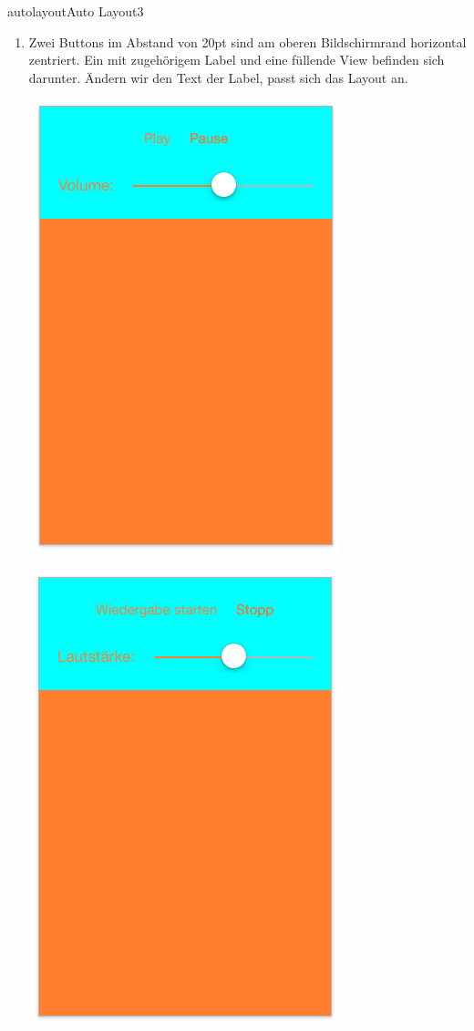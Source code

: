 \documentclass[parskip=half, final]{scrreprt}
\begin{document}
\begin{lecture}
\begin{exc}
\begin{excitem}{autolayout}{Auto Layout}{3}
\begin{enumerate}
\item Zwei Buttons im Abstand von 20pt sind am oberen Bildschirmrand  horizontal zentriert. Ein  mit zugehörigem Label und eine füllende View befinden sich darunter. Ändern wir den Text der Label, passt sich das Layout an.

\begin{minipage}{.5\linewidth}
  \centering
  \includegraphics[width=\linewidth, height=\linewidth, keepaspectratio]{img/al_31.png}
\end{minipage}
\begin{minipage}{.5\linewidth}
  \centering
  \includegraphics[width=\linewidth, height=\linewidth, keepaspectratio]{img/al_32.png}

\end{minipage}
\end{enumerate}
\end{excitem}
\end{exc}
\end{lecture}
\end{document}
